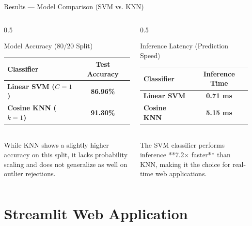\documentclass[aspectratio=169]{beamer}
\begin{document}
\begin{frame}{Results --- Model Comparison (SVM vs. KNN)}
  \begin{columns}
    \begin{column}{0.5\textwidth}
      \begin{block}{Model Accuracy (80/20 Split)}
        \begin{tabular}{lc}
          \toprule
          \textbf{Classifier} & \textbf{Test Accuracy}\\
          \midrule
          \textbf{Linear SVM ($C=1$)} & \textbf{86.96\%}\\
          \textbf{Cosine KNN ($k=1$)} & \textbf{91.30\%}\\
          \bottomrule
        \end{tabular}
        \\[0.5em]
        \footnotesize
        While KNN shows a slightly higher accuracy on this split, it lacks probability scaling and does not generalize as well on outlier rejections.
      \end{block}
    \end{column}
    \begin{column}{0.5\textwidth}
      \begin{block}{Inference Latency (Prediction Speed)}
        \begin{tabular}{lc}
          \toprule
          \textbf{Classifier} & \textbf{Inference Time}\\
          \midrule
          \textbf{Linear SVM} & \textbf{0.71 ms}\\
          \textbf{Cosine KNN} & \textbf{5.15 ms}\\
          \bottomrule
        \end{tabular}
        \\[0.5em]
        \footnotesize
        The SVM classifier performs inference **7.2$\times$ faster** than KNN, making it the choice for real-time web applications.
      \end{block}
    \end{column}
  \end{columns}
\end{frame}

\section{Streamlit Web Application}
\end{document}
